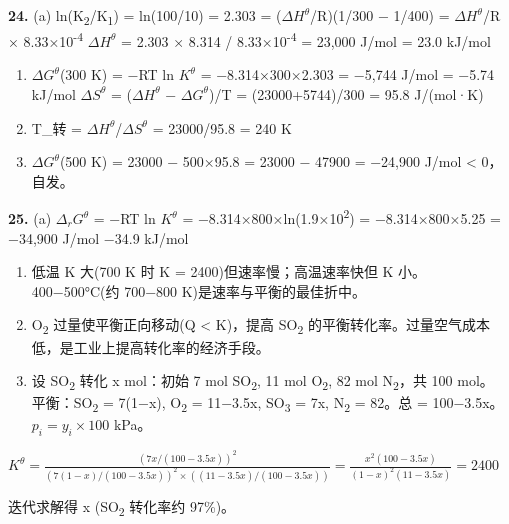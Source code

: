 \textbf{24.}
(a) ln(K\textsubscript{2}/K\textsubscript{1}) = ln(100/10) = 2.303 = (\(\Delta H^\theta\)/R)(1/300 − 1/400) = \(\Delta H^\theta\)/R × 8.33×10\textsuperscript{-4}
\(\Delta H^\theta\) = 2.303 × 8.314 / 8.33×10\textsuperscript{-4} = 23,000 J/mol = 23.0 kJ/mol

\begin{enumerate}
\def\labelenumi{(\alph{enumi})}
\setcounter{enumi}{1}
\item
  \(\Delta G^\theta\)(300 K) = −RT ln \(K^\theta\) = −8.314×300×2.303 = −5,744 J/mol = −5.74 kJ/mol
  \(\Delta S^\theta\) = (\(\Delta H^\theta\) − \(\Delta G^\theta\))/T = (23000+5744)/300 = 95.8 J/(mol·K)
\item
  T\_转 = \(\Delta H^\theta\)/\(\Delta S^\theta\) = 23000/95.8 = 240 K
\item
  \(\Delta G^\theta\)(500 K) = 23000 − 500×95.8 = 23000 − 47900 = −24,900 J/mol \textless{} 0，自发。
\end{enumerate}

\textbf{25.}
(a) \(\Delta_r G^\theta\) = −RT ln \(K^\theta\) = −8.314×800×ln(1.9×10\textsuperscript{2}) = −8.314×800×5.25 = −34,900 J/mol  −34.9 kJ/mol

\begin{enumerate}
\def\labelenumi{(\alph{enumi})}
\setcounter{enumi}{1}
\item
  低温 K 大(700 K 时 K = 2400)但速率慢；高温速率快但 K 小。400−500°C(约 700−800 K)是速率与平衡的最佳折中。
\item
  O\textsubscript{2} 过量使平衡正向移动(Q \textless{} K)，提高 SO\textsubscript{2} 的平衡转化率。过量空气成本低，是工业上提高转化率的经济手段。
\item
  设 SO\textsubscript{2} 转化 x mol：初始 7 mol SO\textsubscript{2}, 11 mol O\textsubscript{2}, 82 mol N\textsubscript{2}，共 100 mol。
  平衡：SO\textsubscript{2} = 7(1−x), O\textsubscript{2} = 11−3.5x, SO\textsubscript{3} = 7x, N\textsubscript{2} = 82。总 = 100−3.5x。
  \(p_i = y_i \times 100\) kPa。
\end{enumerate}

\(K^\theta = \frac{(7x/(100-3.5x))^2}{(7(1-x)/(100-3.5x))^2 \times ((11-3.5x)/(100-3.5x))} = \frac{x^2(100-3.5x)}{(1-x)^2(11-3.5x)} = 2400\)

迭代求解得 x (SO\textsubscript{2} 转化率约 97\%)。
